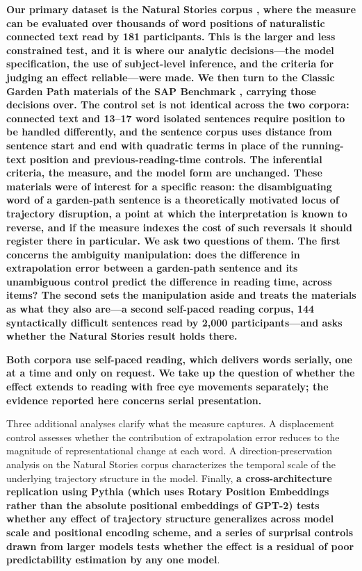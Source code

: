 \documentclass[12pt]{article}
\newcommand{\new}[1]{{\bfseries #1}}
\begin{document}
\new{Our primary dataset is the Natural Stories corpus \citep{futrell2018}, where the measure can be evaluated over thousands of word positions of naturalistic connected text read by 181 participants. This is the larger and less constrained test, and it is where our analytic decisions---the model specification, the use of subject-level inference, and the criteria for judging an effect reliable---were made. We then turn to the Classic Garden Path materials of the SAP Benchmark \citep{huang2024}, carrying those decisions over. The control set is not identical across the two corpora: connected text and 13--17 word isolated sentences require position to be handled differently, and the sentence corpus uses distance from sentence start and end with quadratic terms in place of the running-text position and previous-reading-time controls. The inferential criteria, the measure, and the model form are unchanged. These materials were of interest for a specific reason: the disambiguating word of a garden-path sentence is a theoretically motivated locus of trajectory disruption, a point at which the interpretation is known to reverse, and if the measure indexes the cost of such reversals it should register there in particular. We ask two questions of them. The first concerns the ambiguity manipulation: does the difference in extrapolation error between a garden-path sentence and its unambiguous control predict the difference in reading time, across items? The second sets the manipulation aside and treats the materials as what they also are---a second self-paced reading corpus, 144 syntactically difficult sentences read by 2,000 participants---and asks whether the Natural Stories result holds there.}

\new{Both corpora use self-paced reading, which delivers words serially, one at a time and only on request. We take up the question of whether the effect extends to reading with free eye movements separately; the evidence reported here concerns serial presentation.}

Three additional analyses clarify what the measure captures. A displacement control assesses whether the contribution of extrapolation error reduces to the magnitude of representational change at each word. A direction-preservation analysis on the Natural Stories corpus characterizes the temporal scale of the underlying trajectory structure in the model. Finally, \new{a cross-architecture replication using Pythia (which uses Rotary Position Embeddings rather than the absolute positional embeddings of GPT-2) tests whether any effect of trajectory structure generalizes across model scale and positional encoding scheme, and a series of surprisal controls drawn from larger models tests whether the effect is a residual of poor predictability estimation by any one model}.
\end{document}

